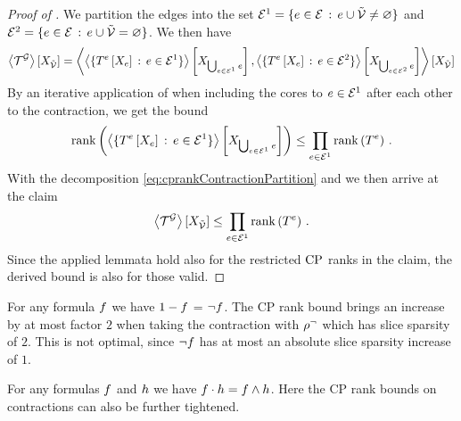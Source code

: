 \begin{proof}[Proof of ]
    We partition the edges into the set $\mathcal{E}^{1}= \{e\in\mathcal{E} \, : \, e\cup\tilde{\mathcal{V}}\neq\varnothing\}$ and $\mathcal{E}^{2}= \{e\in\mathcal{E} \, : \, e\cup\tilde{\mathcal{V}}=\varnothing\}$.
    We then have
    \begin{align}
        \label{eq:cprankContractionPartition}
        \left\langle \mathcal{T}^{\mathcal{G}}\right\rangle \left[ X_{\tilde{\mathcal{V}}} \right]
        = \left\langle 
            \left\langle \{T^{e}\left[X_{e}\right] \, : \, e\in\mathcal{E}^{1}\}\right\rangle \left[ X_{\bigcup_{e\in\mathcal{E}^{1}}e} \right],
            \left\langle \{T^{e}\left[X_{e}\right] \, : \, e\in\mathcal{E}^{2}\}\right\rangle \left[ X_{\bigcup_{e\in\mathcal{E}^{2}}e} \right]
        \right\rangle \left[ X_{\tilde{\mathcal{V}}} \right]
    \end{align}
    By an iterative application of  when including the cores to $e\in\mathcal{E}^{1}$ after each other to the contraction, we get the bound
    \begin{align*}
        \mathrm{rank}\left(\left\langle \{T^{e}\left[X_{e}\right] \, : \, e\in\mathcal{E}^{1}\}\right\rangle \left[ X_{\bigcup_{e\in\mathcal{E}^{1}}e} \right]\right)
        \leq \prod_{e\in\mathcal{E}^{1}} \mathrm{rank}\left(T^{e}\right) \, .
    \end{align*}
    With the decomposition \eqref{eq:cprankContractionPartition} and  we then arrive at the claim
    \begin{align*}
        \left\langle \mathcal{T}^{\mathcal{G}}\right\rangle \left[ X_{\tilde{\mathcal{V}}} \right] \leq \prod_{e\in\mathcal{E}^{1}} \mathrm{rank}\left(T^{e}\right) \, .
    \end{align*}
    Since the applied lemmata hold also for the restricted $\mathrm{CP}$ ranks in the claim, the derived bound is also for those valid.
\end{proof}


\begin{example}
    For any formula $f$ we have $1-f$ = $\lnot f$.
    The CP rank bound brings an increase by at most factor $2$ when taking the contraction with $\rho^{\lnot}$ which has slice sparsity of $2$.
    This is not optimal, since $\lnot f$ has at most an absolute slice sparsity increase of $1$.

    For any formulas $f$ and $h$ we have $f\cdot h = f\land h$.
    Here the CP rank bounds on contractions can also be further tightened.
\end{example}


